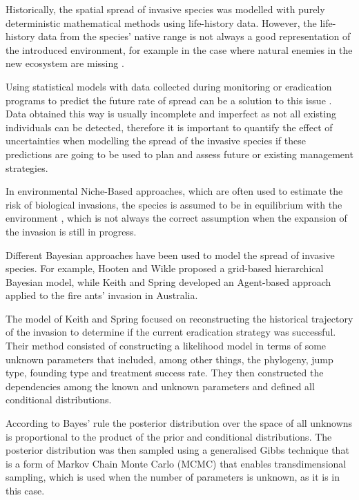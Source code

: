 \documentclass[11pt,a4paper]{article}
\begin{document}
Historically, the spatial spread of invasive species was modelled with purely deterministic mathematical methods using life-history data. However, the life-history data from the species' native range is not always a good representation of the introduced environment, for example in the case where natural enemies in the new ecosystem are missing \cite{Broennimann}. 

Using statistical models with data collected during monitoring or eradication programs to predict the future rate of spread can be a solution to this issue \cite{Hastings}. Data obtained this way is usually incomplete and imperfect as not all existing individuals can be detected, therefore it is important to quantify the effect of uncertainties when modelling the spread of the invasive species if these predictions are going to be used to plan and assess future or existing management strategies. 

In environmental Niche-Based approaches, which are often used to estimate the risk of biological invasions, the species is assumed to be in equilibrium with the environment \cite{Veloz}, which is not always the correct assumption when the expansion of the invasion is still in progress.

Different Bayesian approaches have been used to model the spread of invasive species. For example, Hooten and Wikle \cite{Hooten} proposed a grid-based hierarchical Bayesian model, while Keith and Spring \cite{Keith} developed an Agent-based approach applied to the fire ants’ invasion in Australia. %

The model of Keith and Spring focused on reconstructing the historical trajectory of the invasion to determine if the current eradication strategy was successful. Their method consisted of constructing a likelihood model in terms of some unknown parameters that included, among other things, the phylogeny, jump type, founding type and treatment success rate. They then constructed the dependencies among the known and unknown parameters and defined all conditional distributions. 

According to Bayes' rule the posterior distribution over the space of all unknowns is proportional to the product of the prior and conditional distributions. The posterior distribution was then sampled using a generalised Gibbs technique that is a form of Markov Chain Monte Carlo (MCMC) that enables transdimensional sampling, which is used when the number of parameters is unknown, as it is in this case.
\end{document}
